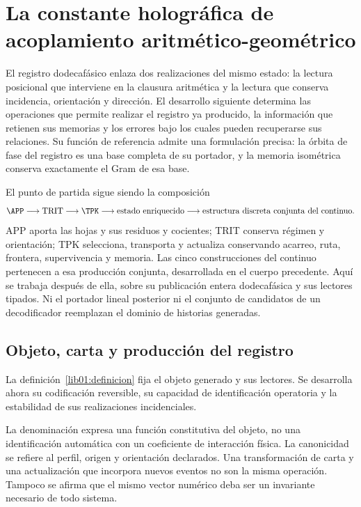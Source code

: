 \section{La constante holográfica de acoplamiento aritmético-geométrico}
\label{lib01:acoplamiento}

El registro dodecafásico enlaza dos realizaciones del mismo estado: la
lectura posicional que interviene en la clausura aritmética y la lectura
que conserva incidencia, orientación y dirección. El desarrollo siguiente
determina las operaciones que permite realizar el registro ya producido,
la información que retienen sus memorias y los errores bajo los cuales
pueden recuperarse sus relaciones.
Su función de referencia admite una formulación precisa: la órbita de fase
del registro es una base completa de su portador, y la memoria isométrica
conserva exactamente el Gram de esa base.

El punto de partida sigue siendo la composición
\[
 \APP\longrightarrow\mathrm{TRIT}\longrightarrow\TPK
 \longrightarrow\text{estado enriquecido}
 \longrightarrow\text{estructura discreta conjunta del continuo}.
\]
APP aporta las hojas y sus residuos y cocientes; TRIT conserva régimen y
orientación; TPK selecciona, transporta y actualiza conservando acarreo,
ruta, frontera, supervivencia y memoria. Las cinco construcciones del
continuo pertenecen a esa producción conjunta, desarrollada en el cuerpo
precedente. Aquí se trabaja después de ella, sobre su publicación entera
dodecafásica y sus lectores tipados. Ni el portador lineal posterior ni el
conjunto de candidatos de un decodificador reemplazan el dominio de
historias generadas.

\subsection{Objeto, carta y producción del registro}
\label{lib01:registro}

La definición~\ref{lib01:definicion} fija el objeto generado y sus lectores. Se desarrolla ahora su codificación reversible, su capacidad de identificación operatoria y la estabilidad de sus realizaciones incidenciales.

La denominación expresa una función constitutiva del objeto, no una
identificación automática con un coeficiente de interacción física. La
canonicidad se refiere al perfil, origen y orientación declarados. Una
transformación de carta y una actualización que incorpora nuevos eventos
no son la misma operación. Tampoco se afirma que el mismo vector numérico
deba ser un invariante necesario de todo sistema.

